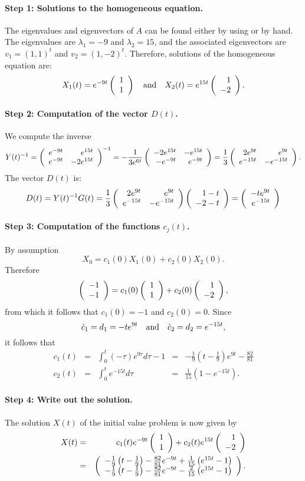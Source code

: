 \documentclass{ximera}
\begin{document}
\paragraph{Step 1: Solutions to the homogeneous equation.} The 
eigenvalues and 
eigenvectors of $A$ can be 
found either by using \Matlab or by hand.  The eigenvalues are $\lambda_1=-9$ 
and $\lambda_2=15$, and the associated eigenvectors are $v_1=(1,1)^t$ 
and $v_2=(1,-2)^t$.  Therefore, solutions of the homogeneous equation are:
\[
X_1(t) = e^{-9t}\left(\begin{array}{r} 1 \\ 1\end{array}\right) \quad\mbox{and}\quad X_2(t) = e^{15t}\left(\begin{array}{r} 1 \\ -2\end{array}\right).
\]

\paragraph{Step 2: Computation of the vector $D(t)$.}   We compute the inverse 
\[
Y(t)^{-1} = \left(\begin{array}{rr} e^{-9t} & e^{15t}\\ e^{-9t} &-2e^{15t}\end{array}\right)^{-1} = 
-\frac{1}{3e^{6t}}\left(\begin{array}{rr} -2e^{15t} & -e^{15t}\\ -e^{-9t} &e^{-9t}\end{array}\right) =
\frac{1}{3}\left(\begin{array}{rr} 2e^{9t} & e^{9t}\\ e^{-15t} &-e^{-15t}\end{array}\right).
\]
The vector $D(t)$ is:
\[
D(t) = Y(t)^{-1} G(t) = 
\frac{1}{3}\left(\begin{array}{rr} 2e^{9t} & e^{9t}\\ e^{-15t} &-e^{-15t}\end{array}\right)\left(\begin{array}{r} 1-t \\ -2-t\end{array}\right)
= \left(\begin{array}{r} -te^{9t} \\ e^{-15t}\end{array}\right)
\]

\paragraph{Step 3: Computation of the functions $c_j(t)$.}   By assumption 
\[
X_0=c_1(0)X_1(0)+c_2(0)X_2(0).
\]
Therefore
\[
\left(\begin{array}{r} -1 \\ -1\end{array}\right) = c_1(0)\left(\begin{array}{r} 1 \\ 1\end{array}\right) + c_2(0)\left(\begin{array}{r} 1 \\ -2\end{array}\right),
\]
from which it follows that $c_1(0)=-1$ and $c_2(0)=0$.  Since
\[
\dot{c}_1 = d_1 = -te^{9t}  \quad\mbox{and}\quad \dot{c}_2 = d_2 = e^{-15t},
\]
it follows that 
\[
\begin{array}{rclcl}
c_1(t) & = & \int_0^t (-\tau) e^{9\tau}d\tau - 1
& = &  -\frac{1}{9}\left(t-\frac{1}{9}\right)e^{9t}-\frac{82}{81} \\
c_2(t) & = & \int_0^t e^{-15t}d\tau & = & \frac{1}{15}\left(1-e^{-15t}\right).
\end{array}
\]

\paragraph{Step 4: Write out the solution.}  The solution $X(t)$ of the 
initial value problem  is now given by
\begin{eqnarray*}
X(t) & = & c_1(t)e^{-9t}\left(\begin{array}{r} 1 \\ 1\end{array}\right) + c_2(t)e^{15t}\left(\begin{array}{r} 1 \\ -2\end{array}\right) \\
& = &  \left(\begin{array}{c}
-\frac{1}{9}\left(t-\frac{1}{9}\right)-
\frac{82}{81}e^{-9t}+\frac{1}{15}\left( e^{15t}-1\right)\\
-\frac{1}{9}\left(t-\frac{1}{9}\right)-
\frac{82}{81}e^{-9t}-\frac{2}{15}\left( e^{15t}-1\right)
\end{array}\right).
\end{eqnarray*}
\end{document}
